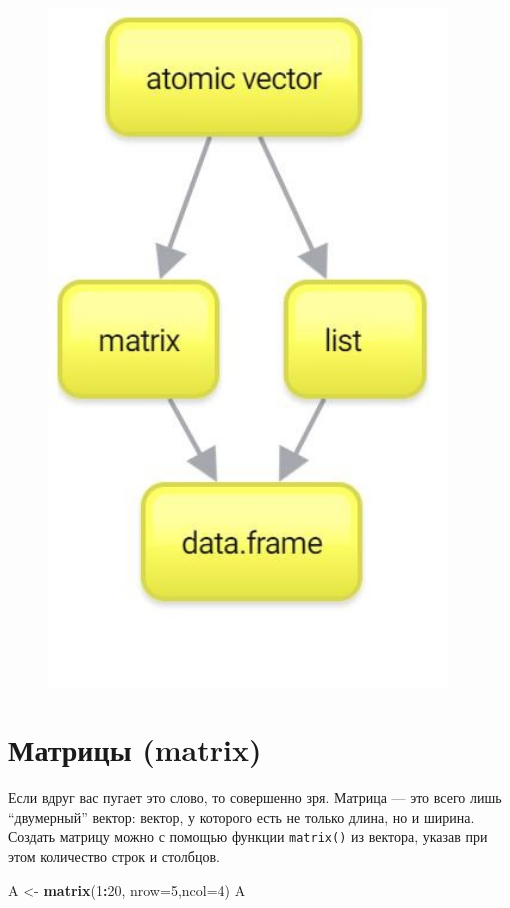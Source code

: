 \documentclass[]{book}
\newenvironment{Shaded}{\begin{snugshade}}{\end{snugshade}}
\newcommand{\KeywordTok}[1]{\textcolor[rgb]{0.13,0.29,0.53}{\textbf{#1}}}
\newcommand{\DataTypeTok}[1]{\textcolor[rgb]{0.13,0.29,0.53}{#1}}
\newcommand{\DecValTok}[1]{\textcolor[rgb]{0.00,0.00,0.81}{#1}}
\newcommand{\StringTok}[1]{\textcolor[rgb]{0.31,0.60,0.02}{#1}}
\newcommand{\OperatorTok}[1]{\textcolor[rgb]{0.81,0.36,0.00}{\textbf{#1}}}
\newcommand{\NormalTok}[1]{#1}
\begin{document}
\begin{figure}
\centering
\includegraphics[width=4.16667in]{images/New-Mind-Map.jpg}
\caption{}
\end{figure}

\section{Матрицы (matrix)}\label{matrix}

Если вдруг вас пугает это слово, то совершенно зря. Матрица --- это
всего лишь ``двумерный'' вектор: вектор, у которого есть не только
длина, но и ширина. Создать матрицу можно с помощью функции
\texttt{matrix()} из вектора, указав при этом количество строк и
столбцов.

\begin{Shaded}
\begin{Highlighting}[]
\NormalTok{A <-}\StringTok{ }\KeywordTok{matrix}\NormalTok{(}\DecValTok{1}\OperatorTok{:}\DecValTok{20}\NormalTok{, }\DataTypeTok{nrow=}\DecValTok{5}\NormalTok{,}\DataTypeTok{ncol=}\DecValTok{4}\NormalTok{)}
\NormalTok{A}
\end{Highlighting}
\end{Shaded}
\end{document}
